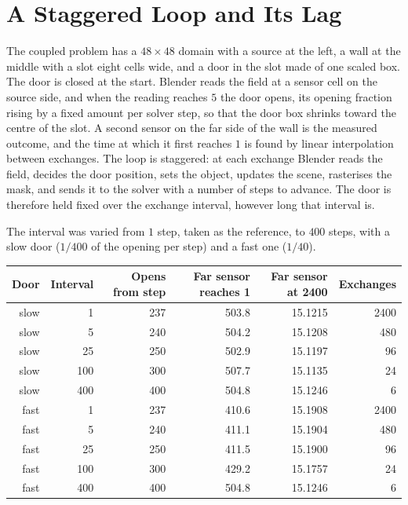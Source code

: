 

\section{A Staggered Loop and Its Lag}

The coupled problem has a $48\times 48$ domain with a source at the left, a wall at the middle with a slot eight cells wide, and a door in the slot made of one scaled box. The door is closed at the start. Blender reads the field at a sensor cell on the source side, and when the reading reaches $5$ the door opens, its opening fraction rising by a fixed amount per solver step, so that the door box shrinks toward the centre of the slot. A second sensor on the far side of the wall is the measured outcome, and the time at which it first reaches $1$ is found by linear interpolation between exchanges. The loop is staggered: at each exchange Blender reads the field, decides the door position, sets the object, updates the scene, rasterises the mask, and sends it to the solver with a number of steps to advance. The door is therefore held fixed over the exchange interval, however long that interval is.



The interval was varied from $1$ step, taken as the reference, to $400$ steps, with a slow door ($1/400$ of the opening per step) and a fast one ($1/40$).

\begin{center}
\small
\setlength{\tabcolsep}{4pt}
\begin{tabular}{rrrrrr}
\toprule
Door & Interval & Opens from step & Far sensor reaches 1 & Far sensor at 2400 & Exchanges\\
\midrule
slow & 1 & 237 & 503.8 & 15.1215 & 2400\\
slow & 5 & 240 & 504.2 & 15.1208 & 480\\
slow & 25 & 250 & 502.9 & 15.1197 & 96\\
slow & 100 & 300 & 507.7 & 15.1135 & 24\\
slow & 400 & 400 & 504.8 & 15.1246 & 6\\
\midrule
fast & 1 & 237 & 410.6 & 15.1908 & 2400\\
fast & 5 & 240 & 411.1 & 15.1904 & 480\\
fast & 25 & 250 & 411.5 & 15.1900 & 96\\
fast & 100 & 300 & 429.2 & 15.1757 & 24\\
fast & 400 & 400 & 504.8 & 15.1246 & 6\\
\bottomrule
\end{tabular}
\end{center}

